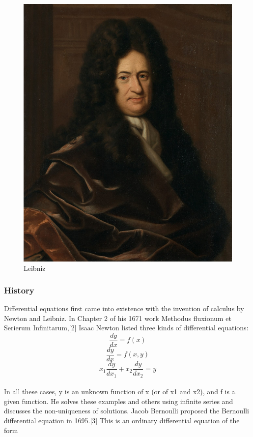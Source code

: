 \documentclass{beamer}
\begin{document}
\begin{frame}[allowframebreaks]
\begin{figure}
\begin{minipage}{.45\textwidth}
      \includegraphics[width=\linewidth]{leibniz}
      \caption{Leibniz}
    \end{minipage}
  \end{figure}
\end{frame}

\begin{frame}[allowframebreaks]
\frametitle {History}
  Differential equations first came into existence with the invention of calculus by Newton and Leibniz. 
  In Chapter 2 of his 1671 work Methodus fluxionum et Serierum Infinitarum,[2] Isaac Newton listed three kinds of differential equations:
  \[{\frac{dy}{dx}}=f(x)\]
  \[{\frac{dy}{dx}}=f(x,y)\]
  \[{x_1\frac{dy}{dx_1}} + {x_2\frac{dy}{dx_2}}=y\]
  \\\framebreak
  In all these cases, y is an unknown function of x (or of x1 and x2), and f is a given function.
  He solves these examples and others using infinite series and discusses the non-uniqueness of solutions.
  Jacob Bernoulli proposed the Bernoulli differential equation in 1695.[3] This is an ordinary differential equation of the form
\end{frame}
\end{document}
